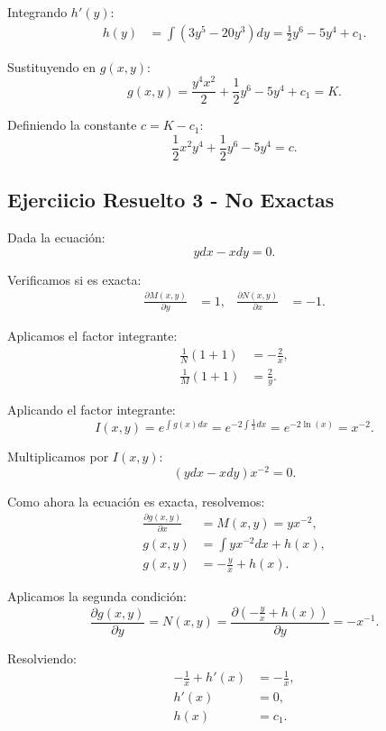 \noindent Integrando \( h'(y) \):
\begin{align*}
h( y) &= \int ( 3y^{5} -20y^{3}) dy = \frac{1}{2} y^{6} -5y^{4} + c_{1}.
\end{align*}

\noindent Sustituyendo en \( g( x,y) \):
\[
g( x,y) = \frac{y^{4} x^{2}}{2} + \frac{1}{2} y^{6} -5y^{4} + c_{1} = K.
\]

\noindent Definiendo la constante \( c = K - c_{1} \):
\[
\frac{1}{2} x^{2} y^{4} + \frac{1}{2} y^{6} -5y^{4} = c.
\]

\subsection{Ejerciicio Resuelto 3 - No Exactas}
Dada la ecuación:
\[
ydx - xdy = 0.
\]

\noindent Verificamos si es exacta:
\begin{align*}
\frac{\partial M( x,y)}{\partial y} &= 1, & \frac{\partial N( x,y)}{\partial x} &= -1.
\end{align*}

\noindent Aplicamos el factor integrante:
\begin{align*}
\frac{1}{N} ( 1+1) &= -\frac{2}{x}, \\
\frac{1}{M} ( 1+1) &= \frac{2}{y}.
\end{align*}

\noindent Aplicando el factor integrante:
\[
I( x,y) = e^{\int g( x) dx} = e^{-2\int \frac{1}{x} dx} = e^{-2\ln( x)} = x^{-2}.
\]

\noindent Multiplicamos por \( I(x,y) \):
\[
(y dx - x dy) x^{-2} = 0.
\]

\noindent Como ahora la ecuación es exacta, resolvemos:
\begin{align*}
\frac{\partial g( x,y)}{\partial x} &= M( x,y) = yx^{-2}, \\
g( x,y) &= \int yx^{-2} dx + h( x), \\
g( x,y) &= -\frac{y}{x} + h( x).
\end{align*}

\noindent Aplicamos la segunda condición:
\[
\frac{\partial g( x,y)}{\partial y} = N( x,y) = \frac{\partial ( -\frac{y}{x} + h( x))}{\partial y} = -x^{-1}.
\]

\noindent Resolviendo:
\begin{align*}
-\frac{1}{x} + h'( x) &= -\frac{1}{x}, \\
h'( x) &= 0, \\
h( x) &= c_{1}.
\end{align*}

